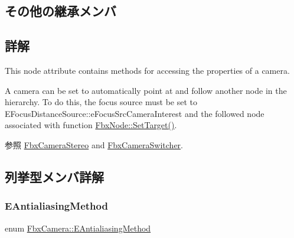 \subsection*{その他の継承メンバ}


\subsection{詳解}
This node attribute contains methods for accessing the properties of a camera.

A camera can be set to automatically point at and follow another node in the hierarchy. To do this, the focus source must be set to E\+Focus\+Distance\+Source\+::e\+Focus\+Src\+Camera\+Interest and the followed node associated with function \hyperlink{class_fbx_node_af421a29f73f7de9f52061c2661569f16}{Fbx\+Node\+::\+Set\+Target()}. \begin{DoxySeeAlso}{参照}
\hyperlink{class_fbx_camera_stereo}{Fbx\+Camera\+Stereo} and \hyperlink{class_fbx_camera_switcher}{Fbx\+Camera\+Switcher}. 
\end{DoxySeeAlso}


\subsection{列挙型メンバ詳解}
\mbox{\label{class_fbx_camera_a44949ea304940f214a2f23a66dcbf45f}} 
\subsubsection{\texorpdfstring{E\+Antialiasing\+Method}{EAntialiasingMethod}}
{\footnotesize\ttfamily enum \hyperlink{class_fbx_camera_a44949ea304940f214a2f23a66dcbf45f}{Fbx\+Camera\+::\+E\+Antialiasing\+Method}}

